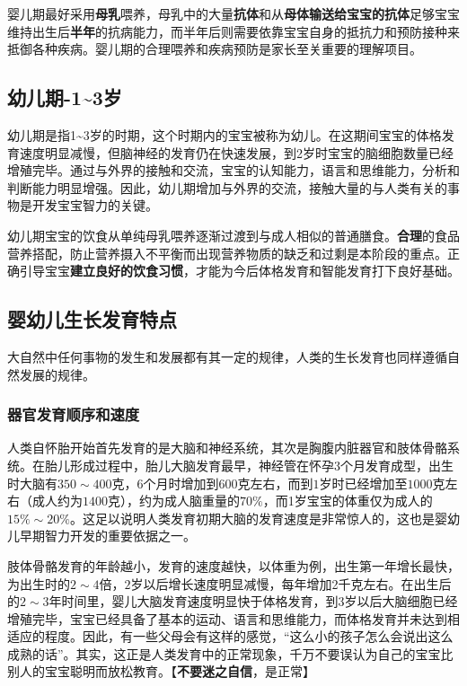 婴儿期最好采用\textbf{母乳}喂养，母乳中的大量\textbf{抗体}和从\textbf{母体输送给宝宝的抗体}足够宝宝维持出生后\textbf{半年}的抗病能力，而半年后则需要依靠宝宝自身的抵抗力和预防接种来抵御各种疾病。婴儿期的合理喂养和疾病预防是家长至关重要的理解项目。

\subsection[幼儿期]{幼儿期-\small 1\textasciitilde3岁}

幼儿期是指1\textasciitilde3岁的时期，这个时期内的宝宝被称为幼儿。在这期间宝宝的体格发育速度明显减慢，但脑神经的发育仍在快速发展，到2岁时宝宝的脑细胞数量已经增殖完毕。通过与外界的接触和交流，宝宝的认知能力，语言和思维能力，分析和判断能力明显增强。因此，幼儿期增加与外界的交流，接触大量的与人类有关的事物是开发宝宝智力的关键。

幼儿期宝宝的饮食从单纯母乳喂养逐渐过渡到与成人相似的普通膳食。\textbf{合理}的食品营养搭配，防止营养摄入不平衡而出现营养物质的缺乏和过剩是本阶段的重点。正确引导宝宝\textbf{建立良好的饮食习惯}，才能为今后体格发育和智能发育打下良好基础。

\subsection{婴幼儿生长发育特点}

大自然中任何事物的发生和发展都有其一定的规律，人类的生长发育也同样遵循自然发展的规律。

\subsubsection{器官发育顺序和速度}

人类自怀胎开始首先发育的是大脑和神经系统，其次是胸腹内脏器官和肢体骨骼系统。在胎儿形成过程中，胎儿大脑发育最早，神经管在怀孕3个月发育成型，出生时大脑有$350\sim{}400$克，$6$个月时增加到$600$克左右，而到$1$岁时已经增加至$1000$克左右（成人约为$1400$克），约为成人脑重量的$70\%$，而1岁宝宝的体重仅为成人的$15\%\sim{}20\%$。这足以说明人类发育初期大脑的发育速度是非常惊人的，这也是婴幼儿早期智力开发的重要依据之一。

肢体骨骼发育的年龄越小，发育的速度越快，以体重为例，出生第一年增长最快，为出生时的$2\sim{}4$倍，$2$岁以后增长速度明显减慢，每年增加2千克左右。在出生后的$2\sim{}3$年时间里，婴儿大脑发育速度明显快于体格发育，到3岁以后大脑细胞已经增殖完毕，宝宝已经具备了基本的运动、语言和思维能力，而体格发育并未达到相适应的程度。因此，有一些父母会有这样的感觉，``这么小的孩子怎么会说出这么成熟的话''。其实，这正是人类发育中的正常现象，千万不要误认为自己的宝宝比别人的宝宝聪明而放松教育。【\textbf{不要迷之自信}，是正常】


